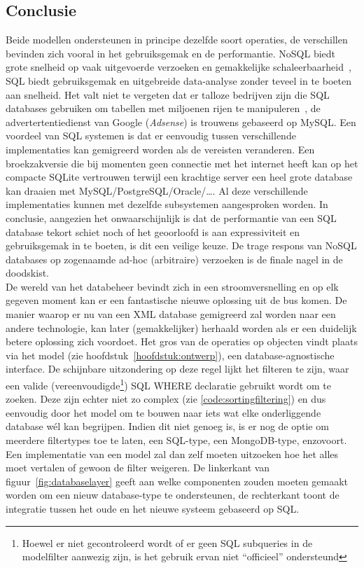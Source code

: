 \subsection{Conclusie}
Beide modellen ondersteunen in principe dezelfde soort operaties, de verschillen bevinden zich vooral in het gebruiksgemak en de performantie. NoSQL biedt grote snelheid op vaak uitgevoerde verzoeken en gemakkelijke schaleerbaarheid~\cite{cassandradatamodel}, SQL biedt gebruiksgemak en uitgebreide data-analyse zonder teveel in te boeten aan snelheid. Het valt niet te vergeten dat er talloze bedrijven zijn die SQL databases gebruiken om tabellen met miljoenen rijen te manipuleren~\cite{postgrescluster, mysqlcluster}, de advertertentiedienst van Google (\emph{Adsense}) is trouwens gebaseerd op MySQL. Een voordeel van SQL systemen is dat er eenvoudig tussen verschillende implementaties kan gemigreerd worden als de vereisten veranderen. Een broekzakversie die bij momenten geen connectie met het internet heeft kan op het compacte SQLite vertrouwen terwijl een krachtige server een heel grote database kan draaien met MySQL/PostgreSQL/Oracle/\ldots. Al deze verschillende implementaties kunnen met dezelfde subsystemen aangesproken worden. In conclusie, aangezien het onwaarschijnlijk is dat de performantie van een SQL database tekort schiet noch of het geoorloofd is aan expressiviteit en gebruiksgemak in te boeten, is dit een veilige keuze. De trage respons van NoSQL databases op zogenaamde ad-hoc (arbitraire) verzoeken is de finale nagel in de doodskist.\\

De wereld van het databeheer bevindt zich in een stroomversnelling en op elk gegeven moment kan er een fantastische nieuwe oplossing uit de bus komen. De manier waarop er nu van een XML database gemigreerd zal worden naar een andere technologie, kan later (gemakkelijker) herhaald worden als er een duidelijk betere oplossing zich voordoet. Het gros van de operaties op objecten vindt plaats via het model (zie hoofdstuk~\ref{hoofdstuk:ontwerp}), een database-agnostische interface. De schijnbare uitzondering op deze regel lijkt het filteren te zijn, waar een valide (vereenvoudigde\footnote{Hoewel er niet gecontroleerd wordt of er geen SQL subqueries in de modelfilter aanwezig zijn, is het gebruik ervan niet ``officieel'' ondersteund}) SQL WHERE declaratie gebruikt wordt om te zoeken. Deze zijn echter niet zo complex (zie \ref{code:sortingfiltering}) en dus eenvoudig door het model om te bouwen naar iets wat elke onderliggende database w\'el kan begrijpen. Indien dit niet genoeg is, is er nog de optie om meerdere filtertypes toe te laten, een SQL-type, een MongoDB-type, enzovoort. Een implementatie van een model zal dan zelf moeten uitzoeken hoe het alles moet vertalen of gewoon de filter weigeren. De linkerkant van figuur~\ref{fig:databaselayer} geeft aan welke componenten zouden moeten gemaakt worden om een nieuw database-type te ondersteunen, de rechterkant toont de integratie tussen het oude en het nieuwe systeem gebaseerd op SQL.

